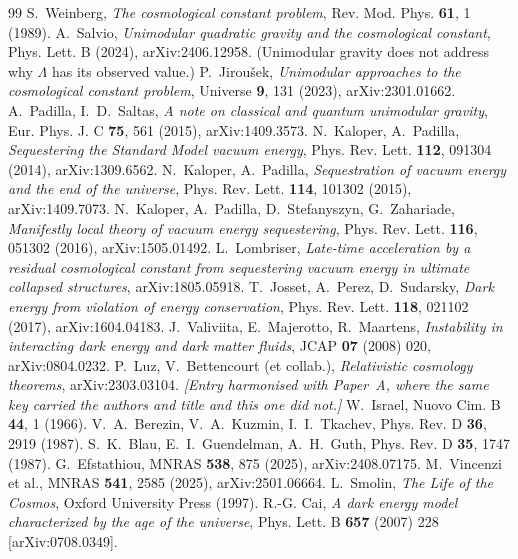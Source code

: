 \documentclass[11pt]{article}
\begin{document}
\begin{thebibliography}{99}
 S.~Weinberg, \emph{The cosmological constant problem}, Rev. Mod. Phys. \textbf{61}, 1 (1989).
 A.~Salvio, \emph{Unimodular quadratic gravity and the cosmological constant}, Phys. Lett. B (2024), arXiv:2406.12958. (Unimodular gravity does not address why $\Lambda$ has its observed value.)
 P.~Jirou\v{s}ek, \emph{Unimodular approaches to the cosmological constant problem}, Universe \textbf{9}, 131 (2023), arXiv:2301.01662.
 A.~Padilla, I.~D.~Saltas, \emph{A note on classical and quantum unimodular gravity}, Eur. Phys. J. C \textbf{75}, 561 (2015), arXiv:1409.3573.
 N.~Kaloper, A.~Padilla, \emph{Sequestering the Standard Model vacuum energy}, Phys. Rev. Lett. \textbf{112}, 091304 (2014), arXiv:1309.6562.
 N.~Kaloper, A.~Padilla, \emph{Sequestration of vacuum energy and the end of the universe}, Phys. Rev. Lett. \textbf{114}, 101302 (2015), arXiv:1409.7073.
 N.~Kaloper, A.~Padilla, D.~Stefanyszyn, G.~Zahariade, \emph{Manifestly local theory of vacuum energy sequestering}, Phys. Rev. Lett. \textbf{116}, 051302 (2016), arXiv:1505.01492.
 L.~Lombriser, \emph{Late-time acceleration by a residual cosmological constant from sequestering vacuum energy in ultimate collapsed structures}, arXiv:1805.05918.
 T.~Josset, A.~Perez, D.~Sudarsky, \emph{Dark energy from violation of energy conservation}, Phys. Rev. Lett. \textbf{118}, 021102 (2017), arXiv:1604.04183.
 J.~Valiviita, E.~Majerotto, R.~Maartens, \emph{Instability in interacting dark energy and dark matter fluids}, JCAP \textbf{07} (2008) 020, arXiv:0804.0232.
 P.~Luz, V.~Bettencourt (et collab.), \emph{Relativistic cosmology theorems}, arXiv:2303.03104. \emph{[Entry harmonised with Paper~A, where the same key carried the authors and title and this one did not.]}
 W.~Israel, Nuovo Cim. B \textbf{44}, 1 (1966).
 V.~A.~Berezin, V.~A.~Kuzmin, I.~I.~Tkachev, Phys. Rev. D \textbf{36}, 2919 (1987).
 S.~K.~Blau, E.~I.~Guendelman, A.~H.~Guth, Phys. Rev. D \textbf{35}, 1747 (1987).
 G.~Efstathiou, MNRAS \textbf{538}, 875 (2025), arXiv:2408.07175.
 M.~Vincenzi et al., MNRAS \textbf{541}, 2585 (2025), arXiv:2501.06664.
 L.~Smolin, \emph{The Life of the Cosmos}, Oxford University Press (1997).
 R.-G. Cai, \emph{A dark energy model characterized by the age of the universe}, Phys. Lett. B \textbf{657} (2007) 228 [arXiv:0708.0349].

\end{thebibliography}
\end{document}
